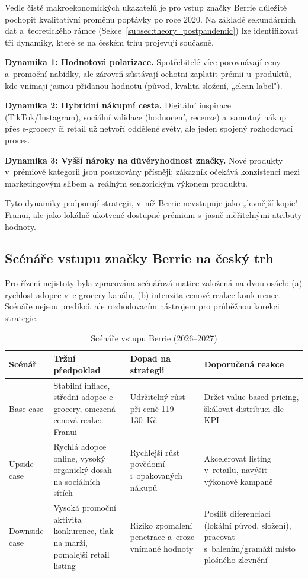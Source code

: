 Vedle čistě makroekonomických ukazatelů je pro vstup značky Berrie důležité pochopit kvalitativní proměnu poptávky po roce 2020. Na základě sekundárních dat a~teoretického rámce (Sekce~\ref{subsec:theory_postpandemic}) lze identifikovat tři dynamiky, které se na českém trhu projevují současně.

\textbf{Dynamika 1: Hodnotová polarizace.} Spotřebitelé více porovnávají ceny a~promoční nabídky, ale zároveň zůstávají ochotni zaplatit prémii u~produktů, kde vnímají jasnou přidanou hodnotu (původ, kvalita složení, „clean label").

\textbf{Dynamika 2: Hybridní nákupní cesta.} Digitální inspirace (TikTok/Instagram), sociální validace (hodnocení, recenze) a~samotný nákup přes e-grocery či retail už netvoří oddělené světy, ale jeden spojený rozhodovací proces.

\textbf{Dynamika 3: Vyšší nároky na důvěryhodnost značky.} Nové produkty v~prémiové kategorii jsou posuzovány přísněji; zákazník očekává konzistenci mezi marketingovým slibem a~reálným senzorickým výkonem produktu.

Tyto dynamiky podporují strategii, v~níž Berrie nevstupuje jako „levnější kopie" Franui, ale jako lokálně ukotvené dostupné prémium s~jasně měřitelnými atributy hodnoty.

\subsection{Scénáře vstupu značky Berrie na český trh}
\label{subsec:res_market_entry_scenarios}

Pro řízení nejistoty byla zpracována scénářová matice založená na dvou osách: (a) rychlost adopce v~e-grocery kanálu, (b) intenzita cenové reakce konkurence. Scénáře nejsou predikcí, ale rozhodovacím nástrojem pro průběžnou korekci strategie.

\begin{table}[H]
\centering
\caption{Scénáře vstupu Berrie (2026--2027)}
\label{tab:entry_scenarios}
\small
\begin{tabularx}{\textwidth}{>{\raggedright\arraybackslash}l>{\raggedright\arraybackslash}X>{\raggedright\arraybackslash}X>{\raggedright\arraybackslash}X}
\toprule
\textbf{Scénář} & \textbf{Tržní předpoklad} & \textbf{Dopad na strategii} & \textbf{Doporučená reakce} \\
\midrule
Base case & Stabilní inflace, střední adopce e-grocery, omezená cenová reakce Franui & Udržitelný růst při ceně 119--130~Kč & Držet value-based pricing, škálovat distribuci dle KPI \\
Upside case & Rychlá adopce online, vysoký organický dosah na sociálních sítích & Rychlejší růst povědomí i~opakovaných nákupů & Akcelerovat listing v~retailu, navýšit výkonové kampaně \\
Downside case & Vysoká promoční aktivita konkurence, tlak na marži, pomalejší retail listing & Riziko zpomalení penetrace a~eroze vnímané hodnoty & Posílit diferenciaci (lokální původ, složení), pracovat s~balením/gramáží místo plošného zlevnění \\
\bottomrule
\end{tabularx}
\normalsize
\end{table}

